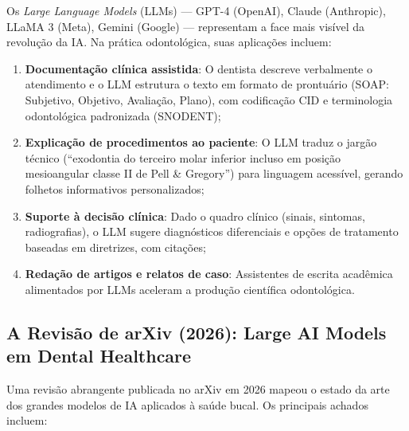 Os \textit{Large Language Models} (LLMs) --- GPT-4 (OpenAI), Claude (Anthropic), LLaMA 3 (Meta), Gemini (Google) --- representam a face mais visível da revolução da IA. Na prática odontológica, suas aplicações incluem:

\begin{enumerate}
    \item \textbf{Documentação clínica assistida}: O dentista descreve verbalmente o atendimento e o LLM estrutura o texto em formato de prontuário (SOAP: Subjetivo, Objetivo, Avaliação, Plano), com codificação CID e terminologia odontológica padronizada (SNODENT);

    \item \textbf{Explicação de procedimentos ao paciente}: O LLM traduz o jargão técnico (``exodontia do terceiro molar inferior incluso em posição mesioangular classe II de Pell \& Gregory'') para linguagem acessível, gerando folhetos informativos personalizados;

    \item \textbf{Suporte à decisão clínica}: Dado o quadro clínico (sinais, sintomas, radiografias), o LLM sugere diagnósticos diferenciais e opções de tratamento baseadas em diretrizes, com citações;

    \item \textbf{Redação de artigos e relatos de caso}: Assistentes de escrita acadêmica alimentados por LLMs aceleram a produção científica odontológica.
\end{enumerate}

\subsection{A Revisão de arXiv (2026): Large AI Models em Dental Healthcare}

Uma revisão abrangente publicada no arXiv em 2026 mapeou o estado da arte dos grandes modelos de IA aplicados à saúde bucal. Os principais achados incluem:


